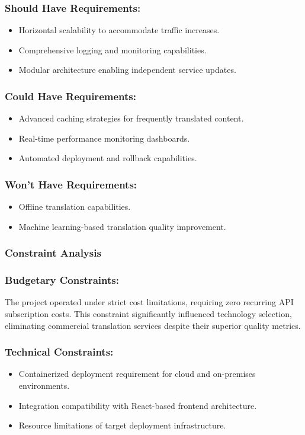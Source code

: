 \subsubsection{Should Have Requirements:}
\begin{itemize}
    \item Horizontal scalability to accommodate traffic increases.
    \item Comprehensive logging and monitoring capabilities.
    \item Modular architecture enabling independent service updates.
\end{itemize}

\subsubsection{Could Have Requirements:}
\begin{itemize}
    \item Advanced caching strategies for frequently translated content.
    \item Real-time performance monitoring dashboards.
    \item Automated deployment and rollback capabilities.
\end{itemize}

\subsubsection{Won't Have Requirements:}
\begin{itemize}
    \item Offline translation capabilities.
    \item Machine learning-based translation quality improvement.
\end{itemize}

\subsubsection{Constraint Analysis}

\subsubsection{Budgetary Constraints:}
The project operated under strict cost limitations, requiring zero recurring API subscription
costs. This constraint significantly influenced technology selection, eliminating commercial
translation services despite their superior quality metrics.

\subsubsection{Technical Constraints:}
\begin{itemize}
    \item Containerized deployment requirement for cloud and on-premises environments.
    \item Integration compatibility with React-based frontend architecture.
    \item Resource limitations of target deployment infrastructure.
\end{itemize}

